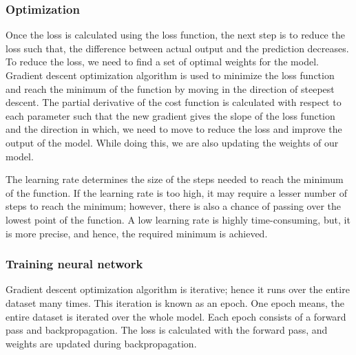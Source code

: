 \subsubsection{Optimization}

Once the loss is calculated using the loss function, the next step is to reduce the loss such that, the difference between actual output and the prediction decreases. To reduce the loss, we need to find a set of optimal weights for the model. Gradient descent optimization algorithm is used to minimize the loss function and reach the minimum of the function by moving in the direction of steepest descent. The partial derivative of the cost function is calculated with respect to each parameter such that the new gradient gives the slope of the loss function and the direction in which, we need to move to reduce the loss and improve the output of the model. While doing this, we are also updating the weights of our model. 
 
\par

The learning rate determines the size of the steps needed to reach the minimum of the function. If the learning rate is too high, it may require a lesser number of steps to reach the minimum; however, there is also a chance of passing over the lowest point of the function. A low learning rate is highly time-consuming, but, it is more precise, and hence, the required minimum is achieved. 


\subsubsection{Training neural network} \label{learning in neural network}

Gradient descent optimization algorithm is iterative; hence it runs over the entire dataset many times. This iteration is known as an epoch. One epoch means, the entire dataset is iterated over the whole model. Each epoch consists of a forward pass and backpropagation. The loss is calculated with the forward pass, and weights are updated during backpropagation.  


